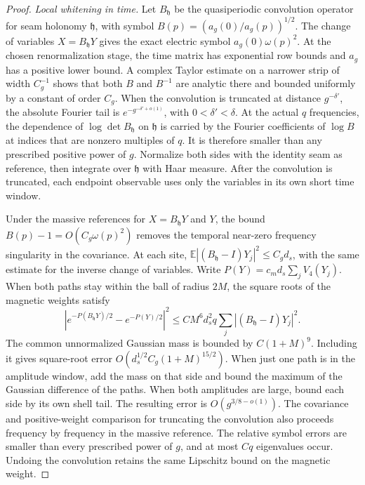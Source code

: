 \documentclass[11pt,a4paper]{article}
\numberwithin{equation}{section}
\newcommand{\hper}{\mathfrak h}
\begin{document}
\begin{proof}
\emph{Local whitening in time.}
Let \(B_\hper \) be the quasiperiodic convolution operator for seam holonomy \(\hper\), with symbol \(B(p)=(a_g(0)/a_g(p))^{1/2}\). The change of variables \(X=B_\hper Y\) gives the exact electric symbol \(a_g(0)\omega(p)^2\). At the chosen renormalization stage, the time matrix has exponential row bounds and \(a_g\) has a positive lower bound. A complex Taylor estimate on a narrower strip of width \(C_g^{-1}\) shows that both \(B\) and \(B^{-1}\) are analytic there and bounded uniformly by a constant of order \(C_g\). When the convolution is truncated at distance \(g^{-\delta'}\), the absolute Fourier tail is \(e^{-g^{-\delta'+o(1)}}\), with \(0<\delta'<\delta\). At the actual \(q\) frequencies, the dependence of \(\log\det B_\hper \) on \(\hper\) is carried by the Fourier coefficients of \(\log B\) at indices that are nonzero multiples of \(q\). It is therefore smaller than any prescribed positive power of \(g\). Normalize both sides with the identity seam as reference, then integrate over \(\hper\) with Haar measure. After the convolution is truncated, each endpoint observable uses only the variables in its own short time window.

Under the massive references for \(X=B_\hper Y\) and \(Y\), the bound \(B(p)-1=O(C_g\omega(p)^2)\) removes the temporal near-zero frequency singularity in the covariance. At each site,
\(\mathbb E|(B_\hper -I)Y_j|^2\le C_g d_s\), with the same estimate for the inverse change of variables. Write
\(P(Y)=c_m d_s\sum_j V_4(Y_j)\). When both paths stay within the ball of radius \(2M\), the square roots of the magnetic weights satisfy
\[
 |e^{-P(B_\hper Y)/2}-e^{-P(Y)/2}|^2
 \le C M^6 d_s^2 q \sum_j|(B_\hper -I)Y_j|^2 .
\]
The common unnormalized Gaussian mass is bounded by \(C(1+M)^9\). Including it gives square-root error
\(O(d_s^{1/2}C_g(1+M)^{15/2})\). When just one path is in the amplitude window, add the mass on that side and bound the maximum of the Gaussian difference of the paths. When both amplitudes are large, bound each side by its own shell tail. The resulting error is \(O(g^{3/8-o(1)})\). The covariance and positive-weight comparison for truncating the convolution also proceeds frequency by frequency in the massive reference. The relative symbol errors are smaller than every prescribed power of \(g\), and at most \(Cq\) eigenvalues occur. Undoing the convolution retains the same Lipschitz bound on the magnetic weight.


\end{proof}
\end{document}

